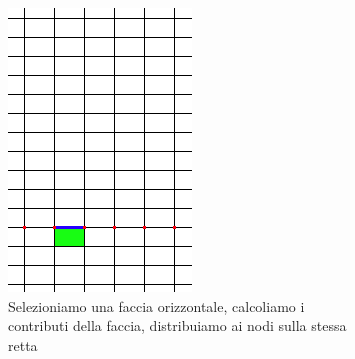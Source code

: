 \documentclass[a4paper,10pt]{report}
\theoremstyle{plain}
\theoremstyle{definition}
\theoremstyle{remark}
\begin{document}
\begin{figure}[p]
  \begin{subfigure}[t]{.48\linewidth}
 \centering
 \includegraphics[width=.85\linewidth]{img/Integrating_on_x}
 \caption{Selezioniamo una faccia orizzontale, calcoliamo i contributi della faccia, distribuiamo ai nodi sulla stessa retta}
 \label{fig:integrating_x}
 \vspace{4ex}
 \end{subfigure}
 \hfill
  \begin{subfigure}[t]{.48\linewidth}
 \centering

\end{subfigure}
\end{figure}
\end{document}
